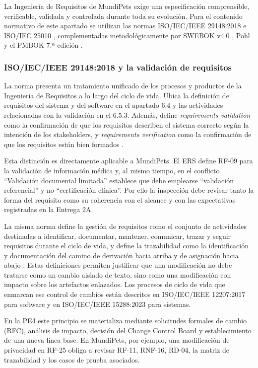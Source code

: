 \documentclass[journal,onecolumn]{IEEEtran}
\begin{document}
	La Ingeniería de Requisitos de MundiPets exige una especificación comprensible, verificable,
	validada y controlada durante toda su evolución. Para el contenido normativo de este apartado se
	utilizan las normas ISO/IEC/IEEE 29148:2018 \cite{iso29148} e ISO/IEC 25010 \cite{iso25010v2011,
		iso25010}, complementadas metodológicamente por SWEBOK v4.0 \cite{swebok4}, Pohl \cite{pohl2025}
	y el PMBOK 7.ª edición \cite{pmbok7}.
	
	\subsubsection{ISO/IEC/IEEE 29148:2018 y la validación de requisitos}
	
	La norma presenta un tratamiento unificado de los procesos y productos de la Ingeniería de
	Requisitos a lo largo del ciclo de vida. Ubica la definición de requisitos del sistema y del
	software en el apartado 6.4 y las actividades relacionadas con la validación en el 6.5.3. Además,
	define \emph{requirements validation} como la confirmación de que los requisitos describen el
	sistema correcto según la intención de los stakeholders, y \emph{requirements verification} como
	la confirmación de que los requisitos están bien formados \cite{iso29148}.
	
	Esta distinción es directamente aplicable a MundiPets. El ERS define RF-09 para la validación de
	información médica y, al mismo tiempo, en el conflicto ``Validación documental limitada''
	establece que debe emplearse ``validación referencial'' y no ``certificación clínica''. Por ello
	la inspección debe revisar tanto la forma del requisito como su coherencia con el alcance y con
	las expectativas registradas en la Entrega 2A.
	
	La misma norma define la gestión de requisitos como el conjunto de actividades destinadas a
	identificar, documentar, mantener, comunicar, trazar y seguir requisitos durante el ciclo de vida,
	y define la trazabilidad como la identificación y documentación del camino de derivación hacia
	arriba y de asignación hacia abajo \cite{iso29148}. Estas definiciones permiten justificar que una
	modificación no debe tratarse como un cambio aislado de texto, sino como una modificación con
	impacto sobre los artefactos enlazados. Los procesos de ciclo de vida que enmarcan ese control de
	cambios están descritos en ISO/IEC/IEEE 12207:2017 \cite{iso12207} para software y en
	ISO/IEC/IEEE 15288:2023 \cite{iso15288} para sistemas.
	
	En la PE4 este principio se materializa mediante solicitudes formales de cambio (RFC), análisis de
	impacto, decisión del Change Control Board y establecimiento de una nueva línea base. En
	MundiPets, por ejemplo, una modificación de privacidad en RF-25 obliga a revisar RF-11, RNF-16,
	RD-04, la matriz de trazabilidad y los casos de prueba asociados.
	
\end{document}
